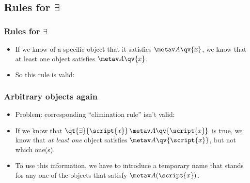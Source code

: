 \subsection{Rules for $\exists$}

\begin{frame}
\frametitle{Rules for $\exists$}

\begin{itemize}[<+->]
\item If we know of a specific object that it satisfies $\metav A\qv{x}$, we know that at least one object satisfies $\metav A\qv{x}$.
\item So this rule is valid:
\begin{fitchproof}
\end{fitchproof}
\end{itemize}
\end{frame}

\begin{frame}
\frametitle{Arbitrary objects again}

\begin{itemize}
  \item Problem: corresponding ``elimination rule'' isn't valid:
  \bigskip
  \begin{fitchproof}
  \end{fitchproof}
  \bigskip
  \item If we know that $\qt{\exists}{\script{x}}\, \metav A\qv{\script{x}}$ is
  true, we know that \emph{at least one} object satisfies $\metav A\qv{\script{x}}$, but not which one(s).
\item To use this information, we have to introduce a temporary name
that stands for any one of the objects that satisfy $\metav A(\script{x})$.
\end{itemize}
\end{frame}

